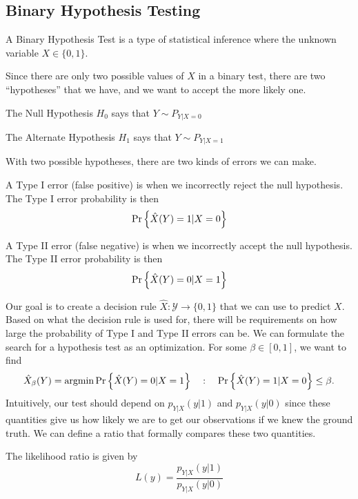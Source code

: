 \subsection{Binary Hypothesis Testing}
\begin{definition}
	A Binary Hypothesis Test is a type of statistical inference where the unknown variable $X\in\{ 0, 1 \}$.
	\label{defn:binary-test}
\end{definition}
Since there are only two possible values of $X$ in a binary test, there are two ``hypotheses'' that we have, and we want to accept the more likely one.
\begin{definition}
	The Null Hypothesis $H_0$ says that $Y\sim P_{Y|X=0}$
	\label{defn:null-hypothesis}
\end{definition}
\begin{definition}
	The Alternate Hypothesis $H_1$ says that $Y\sim P_{Y|X=1}$
	\label{defn:alternate-hypothesis}
\end{definition}
With two possible hypotheses, there are two kinds of errors we can make.
\begin{definition}
	A Type I error (false positive) is when we incorrectly reject the null hypothesis. The Type I error probability is then
	\[
		\text{Pr}\left\{\hat{X}(Y) = 1 | X = 0\right\}
	\]
	\label{defn:type-1-error}
\end{definition}
\begin{definition}
	A Type II error (false negative) is when we incorrectly accept the null hypothesis. The Type II error probability is then
	\[
		\text{Pr}\left\{\hat{X}(Y) = 0 | X = 1\right\}
	\]
	\label{defn:type-2-error}
\end{definition}
Our goal is to create a decision rule $\hat{X}: \mathcal{Y} \to \{0, 1\}$ that we can use to predict $X$.
Based on what the decision rule is used for, there will be requirements on how large the probability of Type I and Type II errors can be.
We can formulate the search for a hypothesis test as an optimization.
For some $\beta \in [0, 1]$, we want to find
\begin{equation}
	\hat{X}_\beta(Y) = \operatorname*{argmin} \text{Pr}\left\{\hat{X}(Y)=0 | X=1\right\} \quad : \quad \text{Pr}\left\{\hat{X}(Y)=1|X=0\right\} \leq \beta.
	\label{eqn:hypothesis-optim}
\end{equation}
Intuitively, our test should depend on $p_{Y|X}(y|1)$ and $p_{Y|X}(y|0)$ since these quantities give us how likely we are to get our observations if we knew the ground truth.
We can define a ratio that formally compares these two quantities.
\begin{definition}
	The likelihood ratio is given by \[
		L(y) = \frac{p_{Y|X}(y|1)}{p_{Y|X}(y|0)}
	\]
	\label{defn:likelhood-ratio}
\end{definition}

